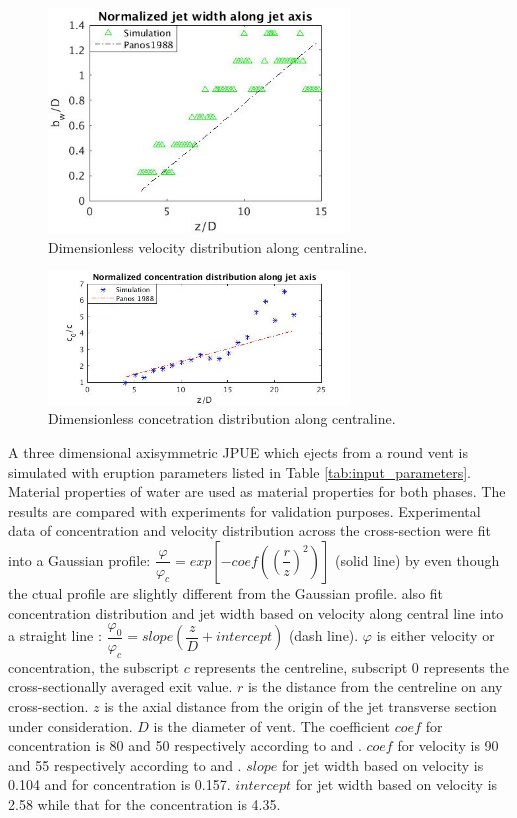 \documentclass[journal abbreviation, manuscript]{copernicus}
\begin{document}
\begin{figure}
\includegraphics[width=8cm]{velo_along_axis}
\caption{Dimensionless velocity distribution along centraline.}
\label{fig:JPUE_along-axis_vel}
\end{figure}
\begin{figure}
\includegraphics[width=8cm]{conc_along_axis}
\caption{Dimensionless concetration distribution along centraline.}
\label{fig:JPUE_along-axis_conc}
\end{figure}

A three dimensional axisymmetric JPUE which ejects from a round vent is simulated with eruption parameters listed in Table \ref{tab:input_parameters}. Material properties of water are used as material properties for both phases. The results are compared with experiments \citep {george1977turbulence, papanicolaou1988investigations} for validation purposes. Experimental data of concentration and velocity distribution across the cross-section were fit into a Gaussian profile: $\dfrac{\varphi}{\varphi_c}=exp \left[-coef\left( \left(\dfrac{r}{z}\right)^2\right)\right]$ (solid line) by \citet{papanicolaou1988investigations} even though the ctual profile are slightly different from the Gaussian profile. \citet{papanicolaou1988investigations} also fit concentration distribution and jet width based on velocity along central line into a straight line : $\dfrac{\varphi_0}{\varphi_c}=slope \left(\dfrac{z}{D} + intercept \right)$ (dash line). $\varphi$ is either velocity or concentration, the subscript $c$ represents the centreline, subscript $0$ represents the cross-sectionally averaged exit value. $r$ is the distance from the centreline on any cross-section. $z$ is the axial distance from the origin of the jet transverse section under consideration. $D$ is the diameter of vent. 
The coefficient $coef$ for concentration is 80 and 50 respectively according to \citet{george1977turbulence} and \citet{papanicolaou1988investigations}. $coef$ for velocity is 90 and 55 respectively according to \citet{george1977turbulence} and \citet{papanicolaou1988investigations}. 
$slope$ for jet width based on velocity is 0.104 and for concentration is 0.157. $intercept$ for jet width based on velocity is 2.58 while that for the concentration is 4.35.
\end{document}
